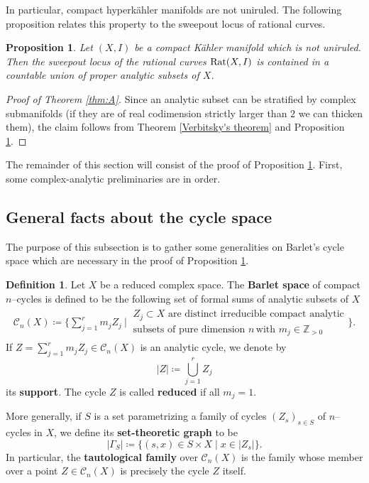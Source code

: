 \documentclass[11pt,a4paper]{article}
\newtheorem{prop}[theorem]{Proposition}
\theoremstyle{definition}
\newtheorem{definition}[theorem]{Definition}
\newcommand{\Rat}{\textnormal{Rat}}
\newcommand{\cC}{\mathcal{C}}
\begin{document}
In particular, compact hyperk\"ahler manifolds are not uniruled. The following proposition relates this property to the sweepout locus of rational curves.

\begin{prop}\label{rational sweepout}
  Let $(X, I)$ be a compact K\"ahler manifold which is not uniruled. Then the sweepout locus of the rational curves $\Rat(X, I)$ is contained in a countable union of proper analytic subsets of $X$.
\end{prop}

\begin{proof}[Proof of Theorem \ref{thm:A}]
  Since an analytic subset can be stratified by complex submanifolds (if they are of real codimension strictly larger than $2$ we can thicken them), the claim follows from Theorem \ref{Verbitsky's theorem} and Proposition \ref{rational sweepout}.
\end{proof}

The remainder of this section will consist of the proof of Proposition \ref{rational sweepout}. First, some complex-analytic preliminaries are in order.

\subsection{General facts about the cycle space}
The purpose of this subsection is to gather some generalities on Barlet's cycle space which are necessary in the proof of Proposition \ref{rational sweepout}.
\begin{definition}
  Let $X$ be a reduced complex space. The \textbf{Barlet space} of compact $n$--cycles is defined to be the following set of formal sums of analytic subsets of $X$
  \begin{align*}
  \mathcal C_n(X)\coloneq \Bigg\{ \sum_{j=1}^{r} m_j Z_j\ \Bigg|\
  \begin{array}{l}
    Z_j \subset X \text{ are distinct irreducible compact analytic} \\
    \text{subsets of pure dimension } n \, \text{with } m_j \in \mathbb Z_{>0}
  \end{array}
  \Bigg\}.
\end{align*}
  If $Z  =\sum_{j=1}^{r} m_j Z_j \in \cC_n(X)$ is an analytic cycle, we denote by 
  \begin{equation*}
    |Z| \coloneq  \bigcup_{j = 1}^r Z_j
  \end{equation*}
  its \textbf{support}. The cycle $Z$ is called \textbf{reduced} if all $m_j = 1$.

  More generally, if $S$ is a set parametrizing a family of cycles $(Z_s)_{s \in S}$ of $n$--cycles in $X$, we define its \textbf{set-theoretic graph} to be 
  \begin{equation*} 
    |\Gamma_S| \coloneq \{(s,x) \in S \times X \mid x \in |Z_s|\}. 
  \end{equation*} 
  In particular, the \textbf{tautological family} over $\cC_n(X)$ is the family whose member over a point $Z \in \cC_n(X)$ is precisely the cycle $Z$ itself.
\end{definition}
\end{document}
